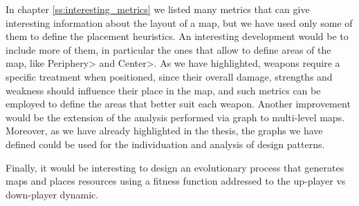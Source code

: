 \par

In chapter \ref{ss:interesting_metrics} we listed many metrics that can give interesting information about the layout of a map, but we have used only some of them to define the placement heuristics. An interesting development would be to include more of them, in particular the ones that allow to define areas of the map, like \<Periphery> and \<Center>. As we have highlighted, weapons require a specific treatment when positioned, since their overall damage, strengths and weakness should influence their place in the map, and such metrics can be employed to define the areas that better suit each weapon. Another improvement would be the extension of the analysis performed via graph to multi-level maps. Moreover, as we have already highlighted in the thesis, the graphs we have defined could be used for the individuation and analysis of design patterns.

\par

Finally, it would be interesting to design an evolutionary process that generates maps and places resources using a fitness function addressed to the up-player vs down-player dynamic.